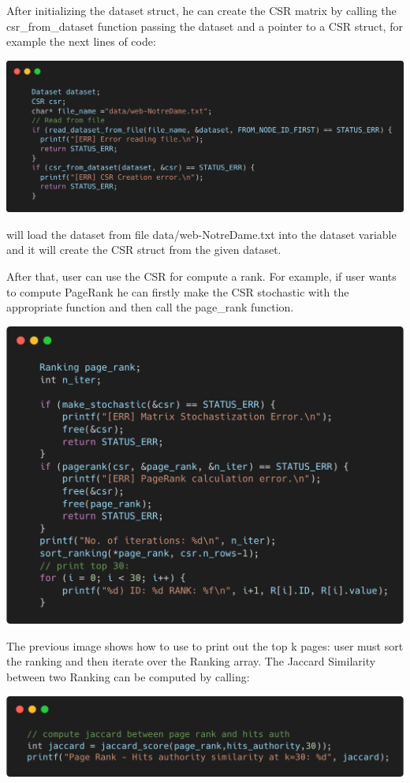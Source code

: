 \documentclass[10pt]{article}
\begin{document}
After initializing the dataset struct, he can create the CSR matrix by calling the csr\_from\_dataset function passing the dataset and a pointer to a CSR struct, for example the next lines of code:
\begin{center}
\includegraphics[scale=0.2]{img/main-1-ex.png}
\end{center}
will load the dataset from file data/web-NotreDame.txt into the dataset variable and it will create the CSR struct from the given dataset.

After that, user can use the CSR for compute a rank. For example, if user wants to compute PageRank he can firstly make the CSR stochastic with the appropriate function and then call the page\_rank function.
\begin{center}
    \includegraphics[scale=0.2]{img/main-2-ex.png}
\end{center}
The previous image shows how to use to print out the top k pages: user must sort the ranking and then iterate over the Ranking array.
The Jaccard Similarity between two Ranking can be computed by calling:  
\begin{center}
    \includegraphics[scale=0.2]{img/main-3-ex.png}
\end{center}
\end{document}
